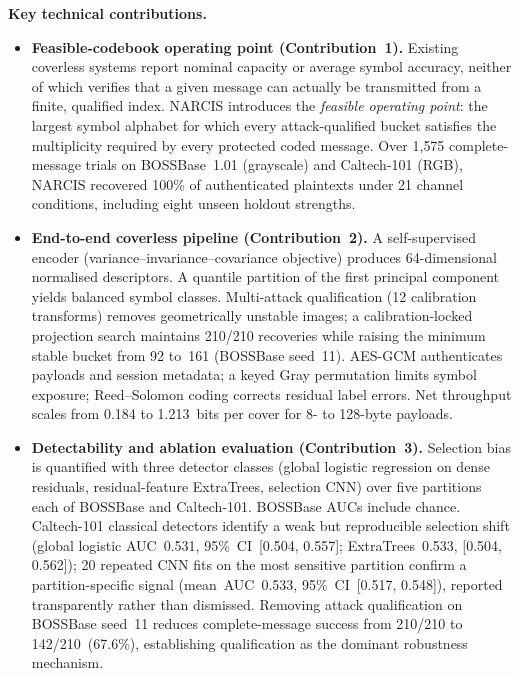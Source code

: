 \documentclass[10pt,letterpaper]{article}
\newcommand{\clhead}[1]{\textcolor{ieeeblue}{\textbf{#1}}}
\begin{document}
\clhead{Key technical contributions.}
\begin{itemize}
\item \textbf{Feasible-codebook operating point (Contribution~1).}
  Existing coverless systems report nominal capacity or average symbol
  accuracy, neither of which verifies that a given message can actually
  be transmitted from a finite, qualified index. NARCIS introduces the
  \emph{feasible operating point}: the largest symbol alphabet for which
  every attack-qualified bucket satisfies the multiplicity required by
  every protected coded message. Over 1{,}575 complete-message trials on
  BOSSBase~1.01 (grayscale) and Caltech-101 (RGB), NARCIS recovered
  100\% of authenticated plaintexts under 21 channel conditions,
  including eight unseen holdout strengths.
\item \textbf{End-to-end coverless pipeline (Contribution~2).}
  A self-supervised encoder (variance--invariance--covariance objective)
  produces 64-dimensional normalised descriptors. A quantile partition
  of the first principal component yields balanced symbol classes.
  Multi-attack qualification (12 calibration transforms) removes
  geometrically unstable images; a calibration-locked projection search
  maintains 210/210 recoveries while raising the minimum stable bucket
  from 92 to~161 (BOSSBase seed~11). AES-GCM authenticates payloads
  and session metadata; a keyed Gray permutation limits symbol exposure;
  Reed--Solomon coding corrects residual label errors. Net throughput
  scales from 0.184 to 1.213~bits per cover for 8- to 128-byte payloads.
\item \textbf{Detectability and ablation evaluation (Contribution~3).}
  Selection bias is quantified with three detector classes (global
  logistic regression on dense residuals, residual-feature ExtraTrees,
  selection CNN) over five partitions each of BOSSBase and Caltech-101.
  BOSSBase AUCs include chance. Caltech-101 classical detectors identify
  a weak but reproducible selection shift (global logistic AUC~0.531,
  95\%~CI~[0.504, 0.557]; ExtraTrees~0.533, [0.504, 0.562]); 20
  repeated CNN fits on the most sensitive partition confirm a
  partition-specific signal (mean~AUC~0.533, 95\%~CI~[0.517, 0.548]),
  reported transparently rather than dismissed. Removing attack
  qualification on BOSSBase seed~11 reduces complete-message success
  from 210/210 to 142/210~(67.6\%), establishing qualification as the
  dominant robustness mechanism.
\end{itemize}
\end{document}
